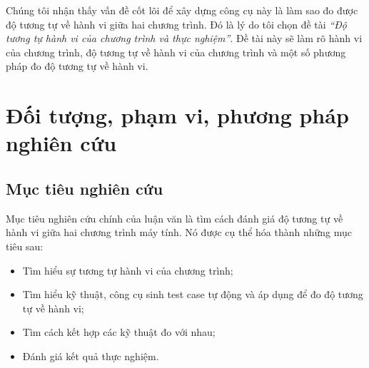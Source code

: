 Chúng tôi nhận thấy vấn đề cốt lõi để xây dựng công cụ này là làm sao
đo được độ tương tự về hành vi giữa hai chương trình. Đó là lý do tôi chọn đề tài \emph{``Độ tương tự hành vi của chương trình và thực nghiệm''}. Đề tài này  sẽ làm rõ hành vi của chương trình, độ tương tự về hành vi của chương trình và một số phương pháp đo độ tương tự về hành vi.




\section{Đối tượng, phạm vi, phương pháp nghiên cứu}
\subsection*{Mục tiêu nghiên cứu}

Mục tiêu nghiên cứu chính của luận văn là tìm cách đánh giá độ tương tự về hành vi giữa hai chương trình máy tính. Nó được cụ thể hóa thành những mục tiêu sau:
\begin{itemize}
\item Tìm hiểu sự tương tự hành vi của chương trình;
\item Tìm hiểu kỹ thuật, công cụ sinh test case tự động và áp dụng để
  đo độ tương tự về hành vi;
\item Tìm cách kết hợp các kỹ thuật đo với nhau;
\item Đánh giá kết quả thực nghiệm.
\end{itemize}

